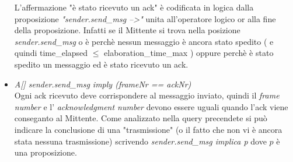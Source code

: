 \documentclass[a4paper]{article}
\begin{document}
\begin{itemize}
		L'affermazione "è stato ricevuto un ack" è codificata in logica dalla proposizione \textit{"sender.send\_msg -->"} unita all'operatore logico or alla fine della proposizione.
		Infatti se il Mittente si trova nella posizione \textit{sender.send\_msg} o è perchè nessun messaggio è ancora stato spedito ( e quindi time\_elapsed $\leq$ elaboration\_time\_max ) oppure perchè è stato spedito un messaggio ed è stato ricevuto un ack.
	\item \textit{A[] sender.send\_msg imply (frameNr == ackNr)}\\
		Ogni ack ricevuto deve corrispondere al messaggio inviato, quindi il \textit{frame number} e l' \textit{acknowledgment number} devono essere uguali quando l'ack viene conseganto al Mittente.
		Come analizzato nella query precendete si può indicare la conclusione di una "trasmissione" (o il fatto che non vi è ancora stata nessuna trasmissione) scrivendo \textit{sender.send\_msg implica p} dove $p$ è una proposizione.

\end{itemize}
\end{document}
